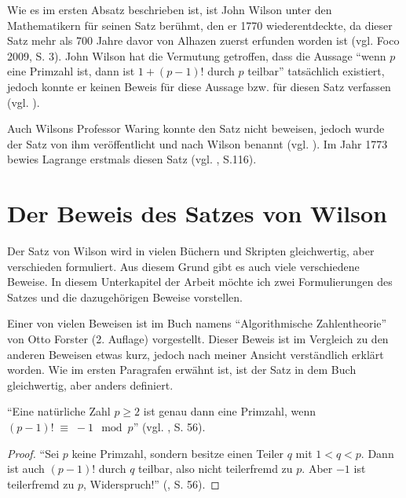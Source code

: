Wie es im ersten Absatz beschrieben ist, ist John Wilson
unter den Mathematikern für seinen Satz berühmt, den er
1770 wiederentdeckte, da dieser Satz mehr als 700 Jahre
davor von Alhazen zuerst erfunden worden ist
(vgl. Foco 2009, S. 3). John Wilson hat die Vermutung
getroffen, dass die Aussage ``wenn $p$ eine Primzahl ist,
dann ist $1+(p-1)!$ durch $p$ teilbar'' tatsächlich
existiert, jedoch konnte er keinen Beweis für diese
Aussage bzw. für diesen Satz verfassen (vgl.
\cite{oconnor_wilson}).

Auch Wilsons Professor Waring konnte den Satz nicht
beweisen, jedoch wurde der Satz von ihm veröffentlicht
und nach Wilson benannt (vgl. \cite{oconnor_wilson}).
Im Jahr 1773 bewies Lagrange erstmals diesen Satz
(vgl. \cite{ziegenbalg}, S.116).


\section{Der Beweis des Satzes von Wilson}

Der Satz von Wilson wird in vielen Büchern und Skripten
gleichwertig, aber verschieden formuliert. Aus diesem
Grund gibt es auch viele verschiedene Beweise.
In diesem Unterkapitel der Arbeit möchte ich zwei
Formulierungen des Satzes und die dazugehörigen Beweise
vorstellen.

Einer von vielen Beweisen ist im Buch namens
``Algorithmische Zahlentheorie'' von Otto Forster
(2. Auflage) vorgestellt. Dieser Beweis ist im Vergleich
zu den anderen Beweisen etwas kurz, jedoch nach meiner
Ansicht verständlich erklärt worden. Wie im ersten 
Paragrafen erwähnt ist, ist der Satz in dem Buch
gleichwertig, aber anders definiert.

\begin{theorem}[Wilson]
``Eine natürliche Zahl $p \geq 2$ ist genau dann eine
Primzahl, wenn $(p-1)! \;\equiv\; -1 \mod p$''
(vgl. \cite{forster}, S. 56).
\end{theorem}
\vspace{-.7cm}

\begin{proof}
 ``Sei $p$ keine Primzahl, sondern besitze einen Teiler
 $q$ mit $1 < q < p$. Dann ist auch $(p-1)!$ durch $q$
 teilbar, also nicht teilerfremd zu $p$. Aber $-1$ ist
 teilerfremd zu $p$, Widerspruch!'' (\cite{forster}, S. 56).
\end{proof}

